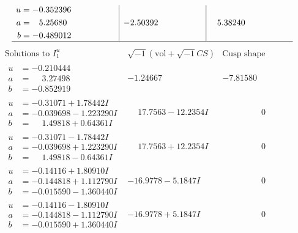 \documentclass[1p]{elsarticle_modified}
\theoremstyle{definition}
\newcommand{\I}{\sqrt{-1}}
\begin{document}
$$\begin{array}{c|c|c}
\begin{aligned}
u &= -0.352396\phantom{ +0.000000I} \\
a &= \phantom{-}5.25680\phantom{ +0.000000I} \\
b &= -0.489012\phantom{ +0.000000I}\end{aligned}
 & -2.50392\phantom{ +0.000000I} & \phantom{-}5.38240\phantom{ +0.000000I}\\
 \hline 
 \end{array}$$\newpage$$\begin{array}{c|c|c}  
\text{Solutions to }I^u_{1}& \I (\text{vol} + \sqrt{-1}CS) & \text{Cusp shape}\\
 \hline 
\begin{aligned}
u &= -0.210444\phantom{ +0.000000I} \\
a &= \phantom{-}3.27498\phantom{ +0.000000I} \\
b &= -0.852919\phantom{ +0.000000I}\end{aligned}
 & -1.24667\phantom{ +0.000000I} & -7.81580\phantom{ +0.000000I} \\ \hline\begin{aligned}
u &= -0.31071 + 1.78442 I \\
a &= -0.039698 - 1.223290 I \\
b &= \phantom{-}1.49818 + 0.64361 I\end{aligned}
 & \phantom{-}17.7563 - 12.2354 I & \phantom{-0.000000 } 0 \\ \hline\begin{aligned}
u &= -0.31071 - 1.78442 I \\
a &= -0.039698 + 1.223290 I \\
b &= \phantom{-}1.49818 - 0.64361 I\end{aligned}
 & \phantom{-}17.7563 + 12.2354 I & \phantom{-0.000000 } 0 \\ \hline\begin{aligned}
u &= -0.14116 + 1.80910 I \\
a &= -0.144818 + 1.112790 I \\
b &= -0.015590 - 1.360440 I\end{aligned}
 & -16.9778 - 5.1847 I & \phantom{-0.000000 } 0 \\ \hline\begin{aligned}
u &= -0.14116 - 1.80910 I \\
a &= -0.144818 - 1.112790 I \\
b &= -0.015590 + 1.360440 I\end{aligned}
 & -16.9778 + 5.1847 I & \phantom{-0.000000 } 0 \\ \hline\begin{aligned}

\end{aligned}
\end{array}$$
\end{document}
